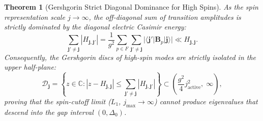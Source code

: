 \documentclass[11pt,reqno]{article}
\newtheorem{theorem}{Theorem}[section]
\begin{document}
\begin{theorem}[Gershgorin Strict Diagonal Dominance for High Spins]
\label{thm:gershgorin_dominance}
As the spin representation scale $j \to \infty$, the off-diagonal sum of transition amplitudes is strictly dominated by the diagonal electric Casimir energy:
\begin{equation}
    \label{eq:gershgorin_dominance_inequality}
    \sum_{\mathbf{j}' \neq \mathbf{j}} |H_{\mathbf{j}, \mathbf{j}'}| = \frac{1}{g^2} \sum_{p \in F} \sum_{\mathbf{j}' \neq \mathbf{j}} |\langle \mathbf{j}' | \mathbf{B}_p | \mathbf{j} \rangle| \ll H_{\mathbf{j}, \mathbf{j}}.
\end{equation}
Consequently, the Gershgorin discs of high-spin modes are strictly isolated in the upper half-plane:
\begin{equation}
    \label{eq:gershgorin_disc_localization}
    \mathcal{D}_{\mathbf{j}} = \left\{ z \in \mathbb{C} : |z - H_{\mathbf{j},\mathbf{j}}| \le \sum_{\mathbf{j}' \neq \mathbf{j}} |H_{\mathbf{j}, \mathbf{j}'}| \right\} \subset \left( \frac{g^2}{4} j_{\mathrm{active}}^2, \; \infty \right),
\end{equation}
proving that the spin-cutoff limit ($L_1$, $j_{\max} \to \infty$) cannot produce eigenvalues that descend into the gap interval $(0, \Delta_0)$.
\end{theorem}
\end{document}
